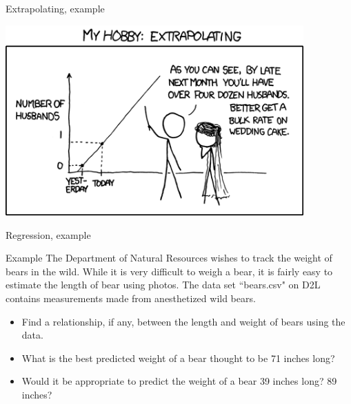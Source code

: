 \documentclass[xcolor=table, aspectratio=169, bigger]{beamer}
\begin{document}
\begin{frame}{Extrapolating, example}

{\centering
\includegraphics[width=4.5in]{../images/ch10_extrapolating}
\par}
\end{frame}



\begin{frame}{Regression, example}
\begin{exampleblock}{Example}
The Department of Natural Resources wishes to track the weight of bears in the wild. While it is very difficult to weigh a bear, it is fairly easy to estimate the length of bear using photos. The data set ``bears.csv" on D2L contains measurements made from anesthetized wild bears.\\
\begin{itemize}
\item Find a relationship, if any, between the length and weight of bears using the data.
\item What is the best predicted weight of a bear thought to be 71 inches long?
\item Would it be appropriate to predict the weight of a bear 39 inches long? 89 inches?
\end{itemize}
\end{exampleblock}
\end{frame}
\end{document}
